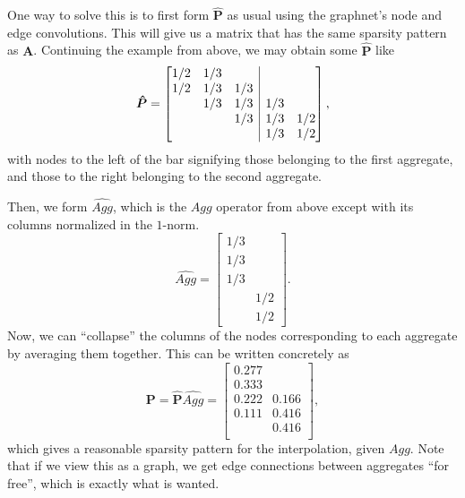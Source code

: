 \documentclass{article}
\newcommand{\mat}[1]{\bm{{#1}}}
\newcommand{\sfrac}[2]{#1/#2}
\begin{document}
One way to solve this is to first form $\mat{\hat{P}}$ as usual using the graphnet's node and edge convolutions.  This will give us a matrix that has the same sparsity pattern as $\mat{A}$.  Continuing the example from above, we may obtain some $\mat{\hat{P}}$ like
\begin{equation}
\mat{\hat{P}} =
\left[\begin{array}{@{}ccc|cc@{}}
  \sfrac{1}{2} & \sfrac{1}{3} & & & \\
  \sfrac{1}{2} & \sfrac{1}{3} & \sfrac{1}{3} & & \\
               & \sfrac{1}{3} & \sfrac{1}{3} & \sfrac{1}{3} &\\
               &              & \sfrac{1}{3} & \sfrac{1}{3} & \sfrac{1}{2} \\
  &              &              & \sfrac{1}{3} & \sfrac{1}{2}
\end{array}\right],
\end{equation}
with nodes to the left of the bar signifying those belonging to the first aggregate, and those to the right belonging to the second aggregate.

Then, we form $\hat{Agg}$, which is the $Agg$ operator from above except with its columns normalized in the $1$-norm.
\begin{equation}
\hat{Agg} =
\begin{bmatrix}
  \sfrac{1}{3} & \\
  \sfrac{1}{3} & \\
  \sfrac{1}{3} & \\
  & \sfrac{1}{2} \\
  & \sfrac{1}{2}
\end{bmatrix}.
\end{equation}
Now, we can ``collapse'' the columns of the nodes corresponding to each aggregate by averaging them together.  This can be written concretely as
\begin{equation}
\mat{P} = \mat{\hat{P}}\hat{Agg} = \begin{bmatrix}
  0.277 & \\
  0.333 & \\
  0.222 & 0.166 \\
  0.111 & 0.416 \\
  & 0.416 \\
\end{bmatrix},
\end{equation}
which gives a reasonable sparsity pattern for the interpolation, given $Agg$.  Note that if we view this as a graph, we get edge connections between aggregates ``for free'', which is exactly what is wanted.
\end{document}
